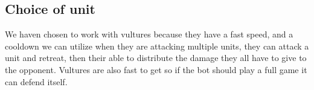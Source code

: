 \subsection{Choice of unit}

We haven chosen to work with vultures because they have a fast speed, and a cooldown we can utilize when they are attacking multiple units, they can attack a unit and retreat, then their able to distribute the damage they all have to give to the opponent. Vultures are also fast to get so if the bot should play a full game it can defend itself. 


